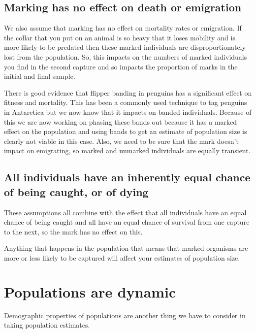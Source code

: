 \documentclass[
  letterpaper,
  DIV=11,
  numbers=noendperiod]{scrreprt}
\begin{document}
\subsection{Marking has no effect on death or
emigration}\label{marking-has-no-effect-on-death-or-emigration}

We also assume that marking has no effect on mortality rates or
emigration. If the collar that you put on an animal is so heavy that it
loses mobility and is more likely to be predated then these marked
individuals are disproportionately lost from the population. So, this
impacts on the numbers of marked individuals you find in the second
capture and so impacts the proportion of marks in the initial and final
sample.

There is good evidence that flipper banding in penguins has a
significant effect on fitness and mortality. This has been a commonly
used technique to tag penguins in Antarctica but we now know that it
impacts on banded individuals. Because of this we are now working on
phasing these bands out because it has a marked effect on the population
and using bands to get an estimate of population size is clearly not
viable in this case. Also, we need to be sure that the mark doesn't
impact on emigrating, so marked and unmarked individuals are equally
transient.

\subsection{All individuals have an inherently equal chance of being
caught, or of
dying}\label{all-individuals-have-an-inherently-equal-chance-of-being-caught-or-of-dying}

These assumptions all combine with the effect that all individuals have
an equal chance of being caught and all have an equal chance of survival
from one capture to the next, so the mark has no effect on this.

Anything that happens in the population that means that marked organisms
are more or less likely to be captured will affect your estimates of
population size.

\section{Populations are dynamic}\label{populations-are-dynamic}

Demographic properties of populations are another thing we have to
consider in taking population estimates.
\end{document}
